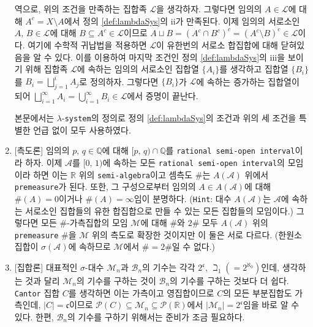 \begin{enumerate}[label = \textsf{\textbf{\arabic*}}]
    역으로, 위의 조건을 만족하는 집합족 $\mathcal{L}$을 생각하자. 그렇다면 임의의 $A\in\mathcal{L}$에 대해 $A^c=X\setminus A$에서 정의 \ref{def:lambdaSys}의 ii가 만족된다. 이제 임의의 서로소인 $A,\,B\in\mathcal{L}$에 대해 $B\subseteq A^c\in\mathcal{L}$이므로 $A\sqcup B=(A^c\cap B^c)^c=(A^c\setminus B)^c\in\mathcal{L}$이다. 여기에 수학적 귀납법을 적용하면 $\mathcal{L}$이 유한번의 서로소 합집합에 대해 닫혀있음을 알 수 있다. 이를 이용하여 마지막 조건인 정의 \ref{def:lambdaSys}의 iii을 보이기 위해 집합족 $\mathcal{L}$에 속하는 임의의 서로소인 집합열 $\{A_i\}$를 생각하고 집합열 $\{B_i\}$를 $B_i=\bigsqcup_{j=1}^iA_j$로 정의하자. 그렇다면 $\{B_i\}$가 $\mathcal{L}$에 속하는 증가하는 집합열이 되어 $\bigsqcup_{i=1}^\infty A_i=\bigcup_{i=1}^\infty B_i\in\mathcal{L}$에서 증명이 끝난다.

    본문에서는 $\lambda$-\texttt{system}의 정의로 정의 \ref{def:lambdaSys}의 조건과 위의 세 조건을 특별한 언급 없이 모두 사용하였다.
    \item \textsf{[측도론]} 임의의 $p,\,q\in\mathbb{Q}$에 대해 $[p,\,q)\cap\mathbb{Q}$를 \texttt{rational semi-open interval}이라 하자. 이제 $\mathcal{A}$를 $[0,\,1)$에 속하는 모든 \texttt{rational semi-open interval}의 모임이라 하면 이는 $\mathbb{R}$ 위의 \texttt{semi-algebra}이고 셈측도 $\#$는 $A(\mathcal{A})$ 위에서 \texttt{premeasure}가 된다. 또한, 그 구성으로부터 임의의 $A\in A(\mathcal{A})$에 대해 $\#(A)=0$이거나 $\#(A)=\infty$임이 분명하다. (\texttt{Hint}: 대수 $A(\mathcal{A})$는 $\mathcal{A}$에 속하는 서로소인 집합들의 유한 합집합으로 만들 수 있는 모든 집합들의 모임이다.) 그렇다면 모든 $\#$-가측집합의 모임 $\mathcal{M}$에 대해 $\#$와 $2\#$ 모두 $A(\mathcal{A})$ 위의 \texttt{premeasure} $\#$을 $\mathcal{M}$ 위의 측도로 확장한 것이지만 이 둘은 서로 다르다. (한원소 집합이 $\sigma(\mathcal{A})$에 속하므로 $\mathcal{M}$에서 $\#=2\#$일 수 없다.)
    \item \textsf{[집합론]} 대표적인 $\sigma$-대수 $\mathcal{M}_n$과 $\mathcal{B}_n$의 기수는 각각 $2^\mathfrak{c},\,\beth_1(=2^{\aleph_0})$인데, 생각하는 것과 달리 $\mathcal{M}_n$의 기수를 구하는 것이 $\mathcal{B}_n$의 기수를 구하는 것보다 더 쉽다. \texttt{Cantor} 집합 $C$를 생각하면 이는 가측이고 영집합이므로 $C$의 모든 부분집합도 가측인데, $|C|=\mathfrak{c}$이므로 $\mathcal{P}(C)\subseteq\mathcal{M}_n\subseteq\mathcal{P}(\mathbb{R})$에서 $|\mathcal{M}_n|=2^\mathfrak{c}$임을 바로 알 수 있다. 한편, $\mathcal{B}_n$의 기수를 구하기 위해서는 준비가 조금 필요하다.


\end{enumerate}

